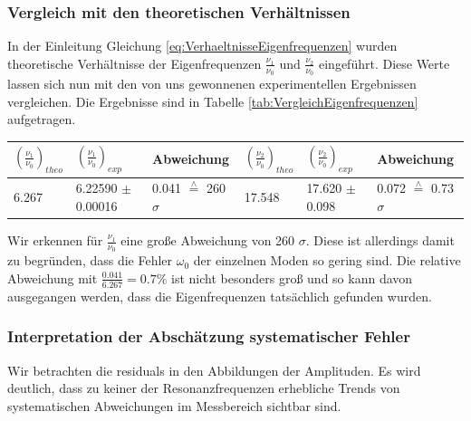 \subsubsection*{Vergleich mit den theoretischen Verhältnissen}

In der Einleitung Gleichung \ref{eq:VerhaeltnisseEigenfrequenzen} wurden theoretische Verhältnisse der Eigenfrequenzen $\frac{\nu_1}{\nu_0}$ und $\frac{\nu_2}{\nu_0}$ eingeführt.
Diese Werte lassen sich nun mit den von uns gewonnenen experimentellen Ergebnissen vergleichen.
Die Ergebnisse sind in Tabelle \ref{tab:VergleichEigenfrequenzen} aufgetragen.

\minipage{\linewidth}
    \begin{center}
        \captionsetup{type=table}
        \begin{adjustbox}{max width=\linewidth, keepaspectratio}
            \begin{tabular}{llllll}
            \toprule
            $\left ( \frac{\nu_1}{\nu_0} \right )_{theo}$ & $\left ( \frac{\nu_1}{\nu_0} \right )_{exp}$ & Abweichung & $\left ( \frac{\nu_2}{\nu_0} \right )_{theo}$ & $\left ( \frac{\nu_2}{\nu_0} \right )_{exp}$ & Abweichung \\
            \midrule
            6.267 & 6.22590 $\pm$ 0.00016 & 0.041 $\overset{\wedge}{=}$ 260 $\sigma$ & 17.548 & 17.620 $\pm$ 0.098 & 0.072 $\overset{\wedge}{=}$ 0.73 $\sigma$ \\
            \bottomrule
            \end{tabular}
        \end{adjustbox}
        \label{tab:VergleichEigenfrequenzen}
    \end{center}
\endminipage

Wir erkennen für $\frac{\nu_1}{\nu_0}$ eine große Abweichung von 260 $\sigma$.
Diese ist allerdings damit zu begründen, dass die Fehler $\omega_0$ der einzelnen Moden so gering sind.
Die relative Abweichung mit $\frac{0.041}{6.267} = 0.7\%$ ist nicht besonders groß und so kann davon ausgegangen werden, dass die Eigenfrequenzen tatsächlich gefunden wurden.

\subsubsection*{Interpretation der Abschätzung systematischer Fehler}

Wir betrachten die residuals in den Abbildungen der Amplituden.
Es wird deutlich, dass zu keiner der Resonanzfrequenzen erhebliche Trends von systematischen Abweichungen im Messbereich sichtbar sind.

